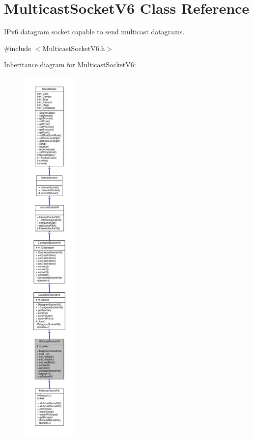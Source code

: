 \hypertarget{classMulticastSocketV6}{}\section{Multicast\+Socket\+V6 Class Reference}
\label{classMulticastSocketV6}


I\+Pv6 datagram socket capable to send multicast datagrams.  




{\ttfamily \#include $<$Multicast\+Socket\+V6.\+h$>$}



Inheritance diagram for Multicast\+Socket\+V6\+:\nopagebreak
\begin{figure}[H]
\begin{center}
\leavevmode
\includegraphics[height=550pt]{classMulticastSocketV6__inherit__graph}
\end{center}
\end{figure}
